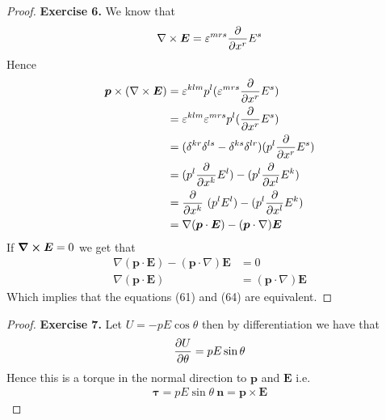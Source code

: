 \documentclass[11pt]{article}
\theoremstyle{definition}
\begin{document}
\cleardoublepage
\begin{proof}{\textbf{Exercise 6.}}
    We know that 
    \begin{align*}
        \nabla \times \bm{E} = \varepsilon^{mrs} \partialderivative{}{x^r} E^s
    \end{align*}
    Hence
    \begin{align*}
        \bm{p} \times (\nabla \times \bm{E})
        &= \varepsilon^{klm} p^l (\varepsilon^{mrs} \partialderivative{}{x^r} E^s)\\
        &= \varepsilon^{klm} \varepsilon^{mrs} p^l(\partialderivative{}{x^r} E^s)\\
        &= (\delta^{kr}\delta^{ls} - \delta^{ks}\delta^{lr})(p^l\partialderivative{}{x^r} E^s)\\
        &= (p^l\partialderivative{}{x^k}E^l) - (p^l\partialderivative{}{x^l}E^k)\\
        &= \partialderivative{}{x^k}~(p^lE^l) - (p^l\partialderivative{}{x^l}E^k)\\
        &= \nabla(\bm{p}\cdot\bm{E}) - (\bm{p}\cdot\nabla)\bm{E}
    \end{align*}
    If $\curl \bm{E} = 0$ we get that
    \begin{align*}
        \nabla(\bm{p}\cdot\bm{E}) - (\bm{p}\cdot\nabla)\bm{E} &= 0\\
        \nabla(\bm{p}\cdot\bm{E}) &= (\bm{p}\cdot\nabla)\bm{E}
    \end{align*}
    Which implies that the equations (61) and (64) are equivalent.
\end{proof}
\cleardoublepage
\begin{proof}{\textbf{Exercise 7.}}
    Let $U = -pE\cos\theta$ then by differentiation we have that
    \begin{align*}
        \partialderivative{U}{\theta} = pE\sin\theta
    \end{align*}
    Hence this is a torque in the normal direction to $\bm{p}$ and $\bm{E}$ i.e.
    \begin{align*}
        \bm{\tau} = pE\sin\theta~\bm{n} = \bm{p} \times \bm{E}
    \end{align*}
\end{proof}
\end{document}

